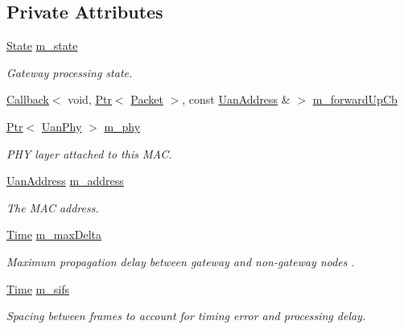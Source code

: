 \subsection*{Private Attributes}
\begin{DoxyCompactItemize}
\item 
\hyperlink{classns3_1_1UanMacRcGw_a72bafb41afd28b05cb9906d5c1f42e2d}{State} \hyperlink{classns3_1_1UanMacRcGw_ac3222d8eea64d77215039f67e90ef96a}{m\+\_\+state}
\begin{DoxyCompactList}\small\item\em Gateway processing state. \end{DoxyCompactList}\item 
\hyperlink{classns3_1_1Callback}{Callback}$<$ void, \hyperlink{classns3_1_1Ptr}{Ptr}$<$ \hyperlink{classns3_1_1Packet}{Packet} $>$, const \hyperlink{classns3_1_1UanAddress}{Uan\+Address} \& $>$ \hyperlink{classns3_1_1UanMacRcGw_ac387b855682d24b25bd9fc21c5c9645c}{m\+\_\+forward\+Up\+Cb}
\item 
\hyperlink{classns3_1_1Ptr}{Ptr}$<$ \hyperlink{classns3_1_1UanPhy}{Uan\+Phy} $>$ \hyperlink{classns3_1_1UanMacRcGw_a68b75b833bd901fb5b26b4ee92205866}{m\+\_\+phy}
\begin{DoxyCompactList}\small\item\em P\+HY layer attached to this M\+AC. \end{DoxyCompactList}\item 
\hyperlink{classns3_1_1UanAddress}{Uan\+Address} \hyperlink{classns3_1_1UanMacRcGw_aca721ba2f63161e937d0f856f4a566a0}{m\+\_\+address}
\begin{DoxyCompactList}\small\item\em The M\+AC address. \end{DoxyCompactList}\item 
\hyperlink{classns3_1_1Time}{Time} \hyperlink{classns3_1_1UanMacRcGw_a5134119f83113902bc01101e46d66542}{m\+\_\+max\+Delta}
\begin{DoxyCompactList}\small\item\em Maximum propagation delay between gateway and non-\/gateway nodes . \end{DoxyCompactList}\item 
\hyperlink{classns3_1_1Time}{Time} \hyperlink{classns3_1_1UanMacRcGw_a563f1bf04fd1d1cf01c6590329e58b4c}{m\+\_\+sifs}
\begin{DoxyCompactList}\small\item\em Spacing between frames to account for timing error and processing delay. \end{DoxyCompactList}\item 

\end{DoxyCompactItemize}
